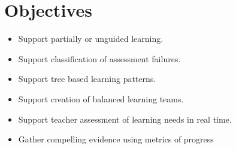 \section{Objectives}

\begin{itemize}
\item Support partially or unguided learning.
\item Support classification of assessment failures.
\item Support tree based learning patterns.
\item Support creation of balanced learning teams.
\item Support teacher assessment of learning needs in real time.
\item Gather compelling evidence using metrics of progress
\end{itemize}

